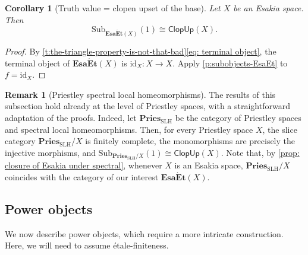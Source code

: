 \documentclass[12pt]{amsart}
\theoremstyle{plain}
\newtheorem{corollary}[theorem]{Corollary}
\theoremstyle{definition}
\newtheorem{remark}[theorem]{Remark}
\newcommand{\cat}[1]{\mathbf{#1}}
\newcommand{\id}{\mathrm{id}}
\newcommand{\Pries}{\cat{Pries}}
\newcommand{\SLH}{\mathrm{SLH}}
\newcommand{\Sub}{\mathrm{Sub}}
\newcommand{\ClopUp}{\mathsf{ClopUp}}
\newcommand{\EsaEt}{\cat{Esa\acute{E}t}}
\begin{document}
\begin{corollary}[Truth value = clopen upset of the base] \label{p:subterminals-EsaEt}
    Let $X$ be an Esakia space. Then
    \[
        \Sub_{\EsaEt(X)}(1) \cong \ClopUp(X).
    \]
\end{corollary}

\begin{proof}
    By \cref{t:the-triangle-property-is-not-that-bad}\eqref{eq: terminal object},
    the terminal object of $\EsaEt(X)$ is $\id_X\colon X\to X$.
    Apply \cref{p:subobjects-EsaEt} to $f=\id_X$.
\end{proof}


\begin{remark}[Priestley spectral local homeomorphisms]
    The results of this subsection hold already at the level of Priestley spaces, with a straightforward adaptation of the proofs.
    Indeed, let $\Pries_{\SLH}$ be the category of Priestley spaces and spectral local homeomorphisms. 
    Then, for every Priestley space $X$, the slice category $\Pries_{\SLH}/X$ is finitely complete, the monomorphisms are precisely the injective morphisms, and $\Sub_{\Pries_{\SLH}/X}(1)\cong \ClopUp(X)$.
    Note that, by \cref{prop: closure of Esakia under spectral}, whenever $X$ is an Esakia space, $\Pries_{\SLH}/X$ coincides with the category of our interest $\EsaEt(X)$.
\end{remark}



\subsection{Power objects}

We now describe power objects, which require a more intricate construction. Here, we will need to assume étale-finiteness.
\end{document}
